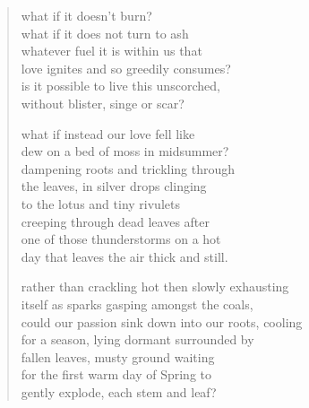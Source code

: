 \begin{verse}
what if it doesn't burn? \\
what if it does not turn to ash  \\
whatever fuel it is within us that  \\
love ignites and so greedily consumes? \\
is it possible to live this unscorched, \\
without blister, singe or scar? 

what if instead our love fell like \\
dew on a bed of moss in midsummer? \\
dampening roots and trickling through \\
the leaves, in silver drops clinging  \\
to the lotus and tiny rivulets \\
creeping through dead leaves after  \\
one of those thunderstorms on a hot \\
day that leaves the air thick and still. 

rather than crackling hot then slowly exhausting \\
itself as sparks gasping amongst the coals, \\
could our passion sink down into our roots, cooling \\
for a season, lying dormant surrounded by \\
fallen leaves, musty ground waiting  \\
for the first warm day of Spring to \\
gently explode, each stem and leaf?
\end{verse}
